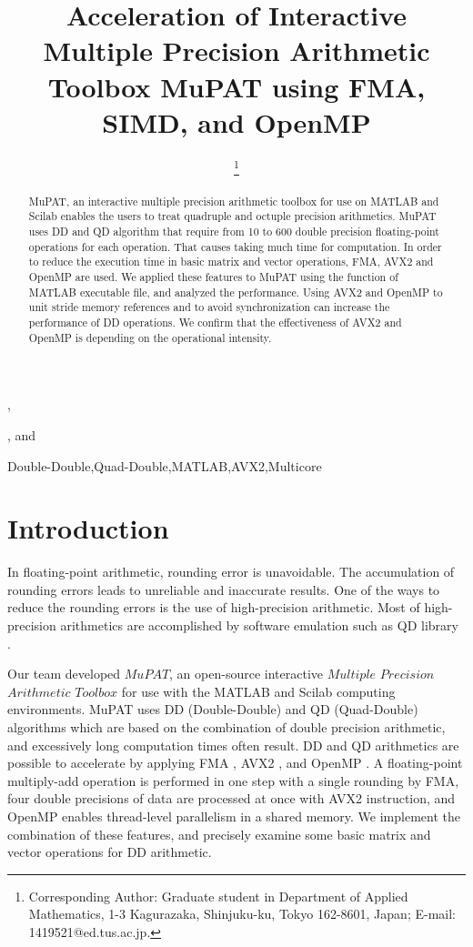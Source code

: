 \documentclass{IOS-Book-Article}
\begin{document}
\pagestyle{plain}

\begin{frontmatter} 
\title{ Acceleration of Interactive Multiple Precision Arithmetic Toolbox MuPAT using FMA,  SIMD, and OpenMP }
\author[A]{{ }
\thanks{Corresponding Author: Graduate student in Department of Applied Mathematics, 1-3 Kagurazaka, Shinjuku-ku, Tokyo 162-8601, Japan; E-mail: 1419521@ed.tus.ac.jp.}},
\author[A]{ },
 and 
\author[B]{  }

\address[A]{Tokyo University of Science, Japan}
\address[B]{ University of Tsukuba, Japan}

\begin{abstract}
MuPAT, an interactive multiple precision arithmetic toolbox for use on MATLAB and Scilab enables the users to treat quadruple and octuple precision arithmetics. MuPAT uses DD and QD algorithm that require from 10 to 600 double precision floating-point operations for each operation. That causes taking much time for computation. In order to reduce the execution time in basic matrix and vector operations, FMA, AVX2 and OpenMP are used. We applied these features to MuPAT using the function of MATLAB executable file, and analyzed the performance. Using AVX2 and OpenMP to unit stride memory references and to avoid synchronization can increase the performance of DD operations. We confirm that the effectiveness of AVX2 and OpenMP is depending on the operational intensity. 
\end{abstract}
\begin{keyword}
Double-Double\sep Quad-Double\sep MATLAB\sep  AVX2\sep Multicore
\end{keyword}
\end{frontmatter}
\section{Introduction}

In floating-point arithmetic, rounding error is unavoidable. The accumulation of rounding errors leads to unreliable and inaccurate results. One of the ways to reduce the rounding errors is the use of high-precision arithmetic.  
Most of high-precision arithmetics are accomplished by software emulation such as QD library \cite{QD}. 

Our team developed $MuPAT$, an open-source interactive $Multiple$ $Precision$ $Arithmetic$ $Toolbox$ \cite{saito, hota} for use with the MATLAB and Scilab computing environments. MuPAT uses DD (Double-Double) \cite{DD} and QD (Quad-Double) \cite{QD,DD} algorithms which are based on the combination of double precision arithmetic, and excessively long computation times often result. 
DD and QD arithmetics are possible to accelerate by applying FMA \cite{SIMD}, AVX2 \cite{SIMD}, and OpenMP \cite{omp}. A floating-point multiply-add operation is performed in one step with a single rounding by FMA, four double precisions of data are processed at once with AVX2 instruction, and OpenMP enables thread-level parallelism in a shared memory. 
We implement the combination of these features, and precisely examine some basic matrix and vector operations for DD arithmetic. 
\end{document}
